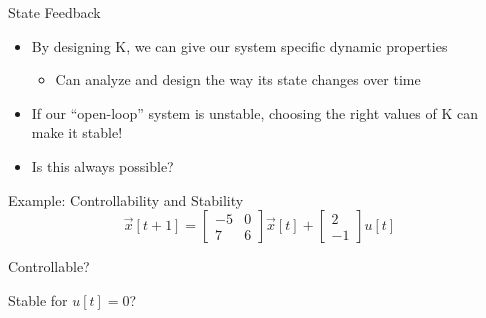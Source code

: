 \begin{frame}{State Feedback}
    \begin{itemize}
        \item
By designing K, we can give our system specific dynamic properties
            \begin{itemize}
        \item
Can analyze and design the way its state changes over time
            \end{itemize}
        \item
If our “open-loop” system is unstable, choosing the right values of K can make it stable!
        \item
Is this always possible?
    \end{itemize}
\end{frame}

\begin{frame}{Example: Controllability and Stability}
    \[
        \vec x[t + 1] = \begin{bmatrix}
            -5 & 0 \\
            7 & 6
            \end{bmatrix} \vec x[t] +  \begin{bmatrix} 2 \\ -1\end{bmatrix} u[t]
    \]

   Controllable?

    Stable for \(u[t] = 0\)?
\end{frame}
